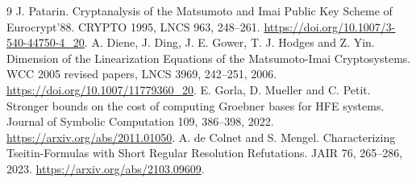 \documentclass[11pt]{article}
\begin{document}
\begin{thebibliography}{9}
 J. Patarin. Cryptanalysis of the Matsumoto and Imai Public
Key Scheme of Eurocrypt'88. CRYPTO 1995, LNCS 963, 248--261.
\url{https://doi.org/10.1007/3-540-44750-4_20}.
 A. Diene, J. Ding, J. E. Gower, T. J. Hodges and Z. Yin.
Dimension of the Linearization Equations of the Matsumoto-Imai Cryptosystems.
WCC 2005 revised papers, LNCS 3969, 242--251, 2006.
\url{https://doi.org/10.1007/11779360_20}.
 E. Gorla, D. Mueller and C. Petit. Stronger bounds on the cost
of computing Groebner bases for HFE systems. Journal of Symbolic Computation
109, 386--398, 2022. \url{https://arxiv.org/abs/2011.01050}.
 A. de Colnet and S. Mengel. Characterizing Tseitin-Formulas
with Short Regular Resolution Refutations. JAIR 76, 265--286, 2023.
\url{https://arxiv.org/abs/2103.09609}.
\end{thebibliography}
\end{document}
